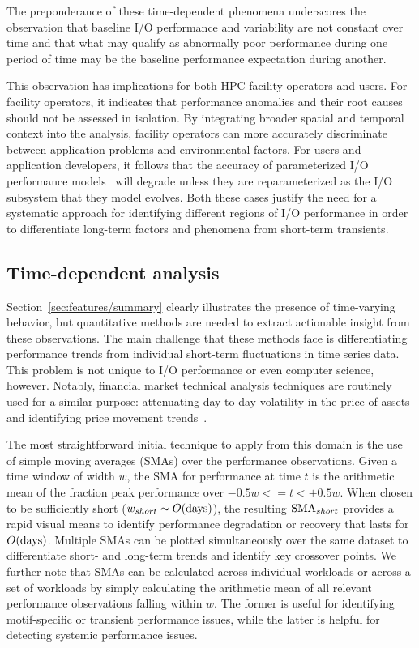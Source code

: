 The preponderance of these time-dependent phenomena underscores the observation that baseline I/O performance and variability are not constant over time and that
what may qualify as abnormally poor performance during one period of time may be the baseline performance expectation during another.

This observation has implications for both HPC facility operators and users.  For
facility operators, it indicates that performance anomalies and their root
causes should not be assessed in isolation. By integrating broader spatial and
temporal context into the analysis, facility operators can more accurately
discriminate between application problems and environmental factors.
For users and application developers, it follows that the accuracy of parameterized I/O performance models~\cite{Xie2012,Madireddy2018} will degrade unless they are reparameterized as the I/O subsystem that they model evolves.
Both  these cases justify the need for a systematic approach for identifying different regions of I/O performance in order to differentiate long-term factors and phenomena from short-term transients.

\subsection{Time-dependent analysis} \label{sec:features/timedependent}

Section~\ref{sec:features/summary} clearly illustrates the presence of
time-varying behavior, but quantitative methods are needed to extract 
actionable insight from these observations.  The main challenge that these
methods face is differentiating performance trends from individual short-term
fluctuations in time series data.
This problem is not unique to I/O performance or even computer science,
however.  Notably, financial market technical analysis techniques are
routinely used for a similar purpose: attenuating day-to-day volatility in
the price of assets and identifying price movement
trends~\cite{james1968monthly,gunasekarage2001profitability}.  

The most straightforward initial technique to apply from this domain is
the use of simple moving averages (SMAs) over the performance observations.
Given a time window of width $w$, the SMA for performance at time $t$ is the arithmetic mean of the fraction peak performance over ${-0.5w <= t < +0.5w}$.
When chosen to be sufficiently short (${w_{short} \sim O(\textup{days})}$),
the resulting $\textup{SMA}_{short}$ provides a rapid visual means to
identify performance degradation or recovery that lasts for
$O(\textup{days})$.  Multiple SMAs can be plotted simultaneously over the
same dataset to differentiate short- and long-term trends and identify key
crossover points.
We further note that SMAs can be calculated across individual workloads or across a set of workloads by simply calculating the arithmetic mean of all relevant performance observations falling within $w$.
The former is useful for identifying motif-specific or transient performance issues, while the latter is helpful for detecting systemic performance issues.

